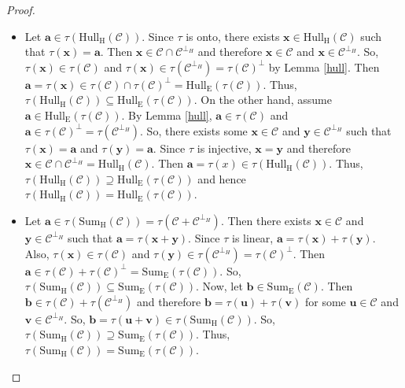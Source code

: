 \documentclass[pdflatex,sn-mathphys-num]{sn-jnl}%
\theoremstyle{thmstyleone}%
\theoremstyle{thmstyletwo}%
\theoremstyle{thmstylethree}%
\begin{document}
\begin{proof}

\begin{itemize}
\item[(i)] Let $\mathbf{a}\in \tau (\mathrm{Hull_{H}}(\mathcal{C}))$. Since $%
\tau $ is onto, there exists $\mathbf{x}\in \mathrm{Hull_{H}}(\mathcal{C})$
such that $\tau (\mathbf{x})=\mathbf{a}$. Then $\mathbf{x}\in \mathcal{C}\cap \mathcal{C}^{\perp _{H}}$ and therefore $\mathbf{x}\in \mathcal{C}$ and
$\mathbf{x}\in \mathcal{C}^{\perp _{H}}$. So, $\tau (\mathbf{x})\in \tau (\mathcal{C})$ and $\tau (\mathbf{x})\in \tau (\mathcal{C}^{\perp _{H}})=\tau
(\mathcal{C})^{\perp }$ by Lemma \ref{hull}. Then $\mathbf{a}=\tau (\mathbf{x})\in \tau (\mathcal{C})\cap \tau (\mathcal{C})^{\perp }=\mathrm{Hull_{E}}(\tau (\mathcal{C}))$. Thus, $\tau (\mathrm{Hull_{H}}(\mathcal{C}))\subseteq
\mathrm{Hull_{E}}(\tau (\mathcal{C}))$. On the other hand, assume $\mathbf{a}\in \mathrm{Hull_{E}}(\tau (\mathcal{C}))$. By Lemma \ref{hull}, $\mathbf{a}\in \tau (\mathcal{C})$ and $\mathbf{a}\in \tau (\mathcal{C})^{\perp }=\tau (\mathcal{C}^{\perp _{H}})$. So, there exists some $\mathbf{x}\in \mathcal{C}$
and $\mathbf{y}\in \mathcal{C}^{\perp _{H}}$ such that $\tau (\mathbf{x})=\mathbf{a}$ and $\tau (\mathbf{y})=\mathbf{a}$. Since $\tau $ is injective, $\mathbf{x}=\mathbf{y}$ and therefore $\mathbf{x}\in \mathcal{C}\cap \mathcal{C}^{\perp _{H}}=\mathrm{Hull_{H}}(\mathcal{C})$. Then $\mathbf{a}=\tau
(x)\in \tau (\mathrm{Hull_{H}}(\mathcal{C}))$. Thus, $\tau (\mathrm{Hull_{H}}(\mathcal{C}))\supseteq \mathrm{Hull_{E}}(\tau (\mathcal{C}))$ and hence $\tau (\mathrm{Hull_{H}}(\mathcal{C}))=\mathrm{Hull_{E}}(\tau (\mathcal{C}))$.

\item[(ii)] Let $\mathbf{a}\in \tau (\mathrm{Sum_{H}}(\mathcal{C}))=\tau (\mathcal{C}+\mathcal{C}^{\perp _{H}})$. Then there exists $\mathbf{x}\in \mathcal{C}$ and $\mathbf{y}\in \mathcal{C}^{\perp _{H}}$ such that $\mathbf{a}=\tau (\mathbf{x}+\mathbf{y})$. Since $\tau $ is linear, $\mathbf{a}=\tau (\mathbf{x})+\tau (\mathbf{y})$. Also, $\tau (\mathbf{x})\in \tau (\mathcal{C})$ and $\tau (\mathbf{y})\in \tau (\mathcal{C}^{\perp _{H}})=\tau (\mathcal{C})^{\perp }$. Then $\mathbf{a}\in \tau (\mathcal{C})+\tau (\mathcal{C})^{\perp }=\mathrm{Sum_{E}}(\tau (\mathcal{C}))$. So, $\tau (\mathrm{Sum_{H}}(\mathcal{C}))\subseteq \mathrm{Sum_{E}}(\tau (\mathcal{C}))$. Now, let $\mathbf{b}\in \mathrm{Sum_{E}}(\mathcal{C})$. Then $\mathbf{b}\in \tau (\mathcal{C})+\tau (\mathcal{C}^{\perp _{H}})$ and therefore $\mathbf{b}=\tau (\mathbf{u})+\tau (\mathbf{v})$ for some $\mathbf{u}\in \mathcal{C}$ and $\mathbf{v}\in \mathcal{C}^{\perp _{H}}$. So, $\mathbf{b}=\tau (\mathbf{u}+\mathbf{v})\in \tau (\mathrm{Sum_{H}}(\mathcal{C}))$. So, $\tau (\mathrm{Sum_{H}}(\mathcal{C}))\supseteq \mathrm{Sum_{E}}(\tau (\mathcal{C}))$. Thus, $\tau (\mathrm{Sum_{H}}(\mathcal{C}))=\mathrm{Sum_{E}}(\tau (\mathcal{C}))$.
\end{itemize}
\end{proof}
\end{document}

